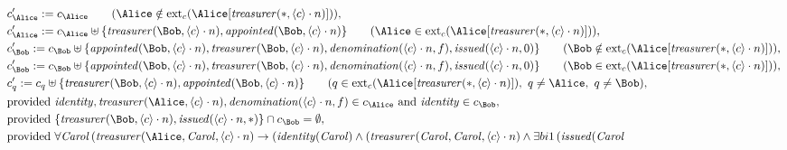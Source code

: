 \begin{align*}
&
c'_
{
\Alice
}
 := 
c_
{
\Alice
}
 \qquad (
\Alice
 \notin 
\mathrm{ext}_c(
\Alice
[
\mathit{
treasurer
}
(
\ast
,
\langle
c
\rangle
\cdot
n
)
]
)
)
,\\
&
c'_
{
\Alice
}
 := 
c_
{
\Alice
}
 \uplus 
\{
\mathit{
treasurer
}
(
\Bob
,
\langle
c
\rangle
\cdot
n
)
,
\mathit{
appointed
}
(
\Bob
,
\langle
c
\rangle
\cdot
n
)
\}
 \qquad (
\Alice
 \in 
\mathrm{ext}_c(
\Alice
[
\mathit{
treasurer
}
(
\ast
,
\langle
c
\rangle
\cdot
n
)
]
)
)
,\\
&
c'_
{
\Bob
}
 := 
c_
{
\Bob
}
 \uplus 
\{
\mathit{
appointed
}
(
\Bob
,
\langle
c
\rangle
\cdot
n
)
,
\mathit{
treasurer
}
(
\Bob
,
\langle
c
\rangle
\cdot
n
)
,
\mathit{
denomination
}
(
\langle
c
\rangle
\cdot
n
,
f
)
,
\mathit{
issued
}
(
\langle
c
\rangle
\cdot
n
,
0
)
\}
 \qquad (
\Bob
 \notin 
\mathrm{ext}_c(
\Alice
[
\mathit{
treasurer
}
(
\ast
,
\langle
c
\rangle
\cdot
n
)
]
)
)
,\\
&
c'_
{
\Bob
}
 := 
c_
{
\Bob
}
 \uplus 
\{
\mathit{
appointed
}
(
\Bob
,
\langle
c
\rangle
\cdot
n
)
,
\mathit{
treasurer
}
(
\Bob
,
\langle
c
\rangle
\cdot
n
)
,
\mathit{
denomination
}
(
\langle
c
\rangle
\cdot
n
,
f
)
,
\mathit{
issued
}
(
\langle
c
\rangle
\cdot
n
,
0
)
\}
 \qquad (
\Bob
 \in 
\mathrm{ext}_c(
\Alice
[
\mathit{
treasurer
}
(
\ast
,
\langle
c
\rangle
\cdot
n
)
]
)
)
,\\
&
c'_
q
 := 
c_
q
 \uplus 
\{
\mathit{
treasurer
}
(
\Bob
,
\langle
c
\rangle
\cdot
n
)
,
\mathit{
appointed
}
(
\Bob
,
\langle
c
\rangle
\cdot
n
)
\}
 \qquad (
q
 \in 
\mathrm{ext}_c(
\Alice
[
\mathit{
treasurer
}
(
\ast
,
\langle
c
\rangle
\cdot
n
)
]
)
,\ 
q \neq 
\Alice
,\ 
q \neq 
\Bob
)
,\\
&
\text{provided } 
\mathit{
identity
}
,
\mathit{
treasurer
}
(
\Alice
,
\langle
c
\rangle
\cdot
n
)
,
\mathit{
denomination
}
(
\langle
c
\rangle
\cdot
n
,
f
)
 \in c_
{
\Alice
}
 \text{ and } 
\mathit{
identity
}
 \in c_
{
\Bob
}
,\\
&
\text{provided } 
\{
\mathit{
treasurer
}
(
\Bob
,
\langle
c
\rangle
\cdot
n
)
,
\mathit{
issued
}
(
\langle
c
\rangle
\cdot
n
,
\ast
)
\}
 \cap c_
{
\Bob
}
 = \emptyset
,\\
&
\text{provided } 
\forall 
\mathit{Carol}
\,(
\mathit{
treasurer
}
(
\Alice
,
\mathit{Carol}
,
\langle
c
\rangle
\cdot
n
)
\rightarrow
(
\mathit{
identity
}
(
\mathit{Carol}
)
\land
(
\mathit{
treasurer
}
(
\mathit{Carol}
,
\mathit{Carol}
,
\langle
c
\rangle
\cdot
n
)
\land
\exists 
bi1
\,(
\mathit{
issued
}
(
\mathit{Carol}

\end{align*}
